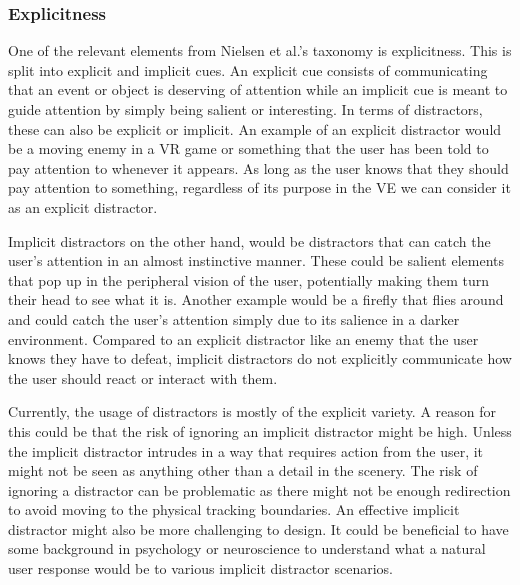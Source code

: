 \subsubsection{Explicitness}
One of the relevant elements from Nielsen et al.'s taxonomy is explicitness. This is split into explicit and implicit cues. An explicit cue consists of communicating that an event or object is deserving of attention while an implicit cue is meant to guide attention by simply being salient or interesting. In terms of distractors, these can also be explicit or implicit. An example of an explicit distractor would be a moving enemy in a VR game or something that the user has been told to pay attention to whenever it appears. As long as the user knows that they should pay attention to something, regardless of its purpose in the VE we can consider it as an explicit distractor. 

Implicit distractors on the other hand, would be distractors that can catch the user's attention in an almost instinctive manner. These could be salient elements that pop up in the peripheral vision of the user, potentially making them turn their head to see what it is. Another example would be a firefly that flies around and could catch the user's attention simply due to its salience in a darker environment. Compared to an explicit distractor like an enemy that the user knows they have to defeat, implicit distractors do not explicitly communicate how the user should react or interact with them. 

Currently, the usage of distractors is mostly of the explicit variety. A reason for this could be that the risk of ignoring an implicit distractor might be high. Unless the implicit distractor intrudes in a way that requires action from the user, it might not be seen as anything other than a detail in the scenery. The risk of ignoring a distractor can be problematic as there might not be enough redirection to avoid moving to the physical tracking boundaries. An effective implicit distractor might also be more challenging to design. It could be beneficial to have some background in psychology or neuroscience to understand what a natural user response would be to various implicit distractor scenarios.  


